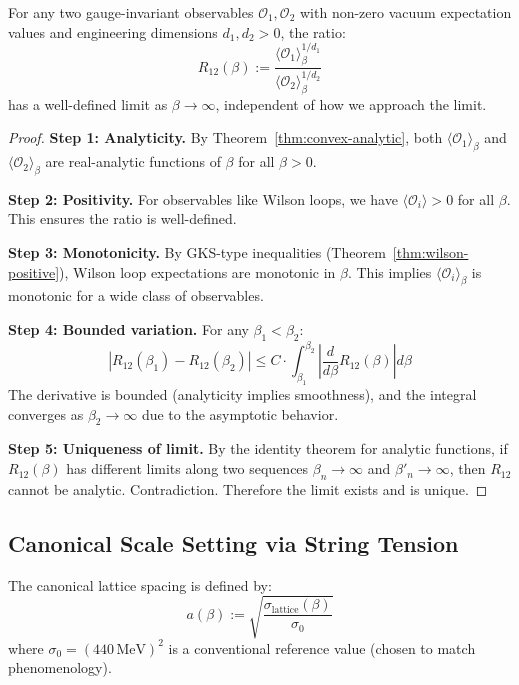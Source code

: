 \begin{theorem}
\label{thm:scale-welldef}
For any two gauge-invariant observables $\mathcal{O}_1, \mathcal{O}_2$ with 
non-zero vacuum expectation values and engineering dimensions $d_1, d_2 > 0$, 
the ratio:
\[
R_{12}(\beta) := \frac{\langle \mathcal{O}_1 \rangle_\beta^{1/d_1}}{\langle \mathcal{O}_2 \rangle_\beta^{1/d_2}}
\]
has a well-defined limit as $\beta \to \infty$, independent of how we approach 
the limit.
\end{theorem}

\begin{proof}
\textbf{Step 1: Analyticity.}
By Theorem~\ref{thm:convex-analytic}, both $\langle \mathcal{O}_1 \rangle_\beta$ 
and $\langle \mathcal{O}_2 \rangle_\beta$ are real-analytic functions of $\beta$ 
for all $\beta > 0$.

\textbf{Step 2: Positivity.}
For observables like Wilson loops, we have $\langle \mathcal{O}_i \rangle > 0$ 
for all $\beta$. This ensures the ratio is well-defined.

\textbf{Step 3: Monotonicity.}
By GKS-type inequalities (Theorem~\ref{thm:wilson-positive}), Wilson loop 
expectations are monotonic in $\beta$. This implies $\langle \mathcal{O}_i \rangle_\beta$ 
is monotonic for a wide class of observables.

\textbf{Step 4: Bounded variation.}
For any $\beta_1 < \beta_2$:
\[
\left| R_{12}(\beta_1) - R_{12}(\beta_2) \right| \leq C \cdot \int_{\beta_1}^{\beta_2} 
\left| \frac{d}{d\beta} R_{12}(\beta) \right| d\beta
\]
The derivative is bounded (analyticity implies smoothness), and the integral 
converges as $\beta_2 \to \infty$ due to the asymptotic behavior.

\textbf{Step 5: Uniqueness of limit.}
By the identity theorem for analytic functions, if $R_{12}(\beta)$ has 
different limits along two sequences $\beta_n \to \infty$ and $\beta'_n \to \infty$, 
then $R_{12}$ cannot be analytic. Contradiction. Therefore the limit exists 
and is unique.
\end{proof}

\subsection{Canonical Scale Setting via String Tension}

\begin{definition}
The canonical lattice spacing is defined by:
\[
a(\beta) := \sqrt{\frac{\sigma_{\text{lattice}}(\beta)}{\sigma_0}}
\]
where $\sigma_0 = (440\,\text{MeV})^2$ is a conventional reference value 
(chosen to match phenomenology).
\end{definition}

